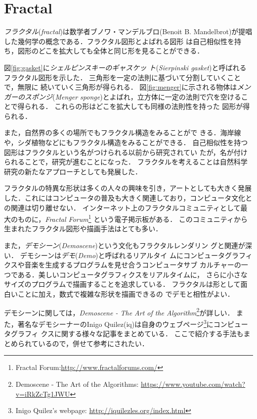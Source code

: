 
\section{Fractal}

\emph{フラクタル}(\textit{fractal})は数学者ブノワ・マンデルブロ(Benoit
B. Mandelbrot)が提唱した幾何学の概念である．フラクタル図形とよばれる図形
は自己相似性を持ち，図形のどこを拡大しても全体と同じ形を見ることができる．

図\ref{fig:gasket}に\emph{シェルピンスキーのギャスケッ
ト}(\textit{Sierpinski gasket})と呼ばれるフラクタル図形を示した．
三角形を一定の法則に基づいて分割していくことで，無限に
続いていく三角形が得られる．
図\ref{fig:menger}に示される物体は\emph{メンガーのスポンジ}(\textit{Menger
sponge})とよばれ，立方体に一定の法則で穴を空けることで得られる．
これらの形はどこを拡大しても同様の法則性を持った
図形が得られる．

また，自然界の多くの場所でもフラクタル構造をみることがで
きる．海岸線や，シダ植物などにもフラクタル構造をみることができる．
自己相似性を持つ図形はフラクタルという名がつけられる以前から研究されてい
たが，名が付けられることで，研究が進むことになった．
フラクタルを考えることは自然科学研究の新たなアプローチとしても発展した．

フラクタルの特異な形状は多くの人々の興味を引き，アートとしても大きく発展
した．これにはコンピュータの普及も大きく関連しており，コンピュータ文化と
の関連は切り離せない．
インターネット上のフラクタルコミュニティとして最大のものに，\textit{Fractal
Forum}\footnote{Fractal Forum:\url{http://www.fractalforums.com/}}
という電子掲示板がある．
このコミュニティから生まれたフラクタル図形や描画手法はとても多い．

また，\emph{デモシーン}(\textit{Demoscene})という文化もフラクタルレンダリン
グと関連が深い．
デモシーンは\emph{デモ}(\textit{Demo})と呼ばれるリアルタイ
ムにコンピュータグラフィクスや音楽を生成するプログラムを見せ合うコンピュータサブ
カルチャーの一つである．美しいコンピュータグラフィクスをリアルタイムに，
さらに小さなサイズのプログラムで描画することを追求している．
フラクタルは形として面白いことに加え，数式で複雑な形状を描画できるの
でデモと相性がよい．

デモシーンに関しては，\textit{Demoscene - The
Art of the Algorithm}\footnote{Demoscene - The Art of the Algorithms:
 \url{https://www.youtube.com/watch?v=iRkZcTg1JWU}}が詳しい．
また，著名なデモシーナーのInigo Quilez(iq)は自身のウェブページ\footnote{Inigo
Quilez's webpage: \url{http://iquilezles.org/index.html}}にコンピュータグラフィ
クスに関する様々な記事をまとめている．
ここで紹介する手法もまとめられているので，併せて参考にされたい．

